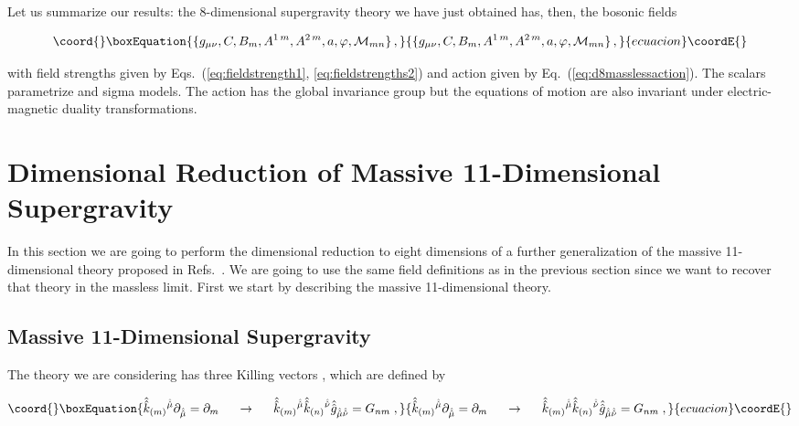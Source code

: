 \documentclass[12pt,a4paper]{article}
\begin{document}
Let us summarize our results: the 8-dimensional supergravity theory we
have just obtained has, then, the bosonic fields

\begin{equation}\coord{}\boxEquation{
\{g_{\mu\nu}, C, B_{m}, A^{1\, m}, A^{2\, m}, a,\varphi,{\cal M}_{mn} \}\, ,
}{
\{g_{\mu\nu}, C, B_{m}, A^{1\, m}, A^{2\, m}, a,\varphi,{\cal M}_{mn} \}\, ,
}{ecuacion}\coordE{}\end{equation}

\noindent with field strengths given by Eqs.~(\ref{eq:fieldstrength1},
\ref{eq:fieldstrengths2}) and action given by
Eq.~(\ref{eq:d8masslessaction}). The scalars parametrize
\coordHE{} and \coordHE{} sigma models.
The action has the global invariance group \coordHE{} but the
equations of motion are also invariant under \coordHE{}
electric-magnetic duality transformations.


\section{Dimensional Reduction of Massive 11-Dimensional Supergravity}
\label{sec-massivesugra}

In this section we are going to perform the dimensional reduction to
eight dimensions of a further generalization of the massive
11-dimensional theory proposed in Refs.~\cite{kn:BLO,kn:MO}. We are
going to use the same field definitions as in the previous section
since we want to recover that theory in the massless limit. First we
start by describing the massive 11-dimensional theory.

\subsection{Massive 11-Dimensional Supergravity}


The theory we are considering has three Killing vectors
\coordHE{}, which are defined by

\begin{equation}\coord{}\boxEquation{
\hat{\hat{k}}_{(m)}{}^{\hat{\hat{\mu}}}
\partial_{\hat{\hat{\mu}}}= \partial_{m} 
\hspace{.5cm}\rightarrow\hspace{.5cm}
\hat{\hat{k}}_{(m)}{}^{\hat{\hat{\mu}}}
\hat{\hat{k}}_{(n)}{}^{\hat{\hat{\nu}}}
\hat{\hat{g}}_{\hat{\hat{\mu}}\hat{\hat{\nu}}}=
G_{nm}\; ,
\label{eq:KillDef}
}{
\hat{\hat{k}}_{(m)}{}^{\hat{\hat{\mu}}}
\partial_{\hat{\hat{\mu}}}= \partial_{m} 
\hspace{.5cm}\rightarrow\hspace{.5cm}
\hat{\hat{k}}_{(m)}{}^{\hat{\hat{\mu}}}
\hat{\hat{k}}_{(n)}{}^{\hat{\hat{\nu}}}
\hat{\hat{g}}_{\hat{\hat{\mu}}\hat{\hat{\nu}}}=
G_{nm}\; ,
}{ecuacion}\coordE{}\end{equation}
\end{document}
